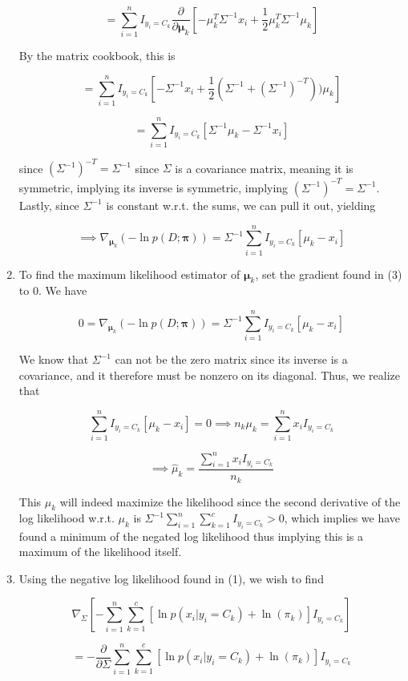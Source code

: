 \documentclass[submit]{harvardml}
\begin{document}
\begin{enumerate}
    $$ = \sum_{i=1}^n  I_{y_i=C_k} \frac{\partial}{\partial \mathbf{\mu}_k}[ -\mu_k^T\Sigma^{-1}x_i  + \frac{1}{2}\mu_k^T\Sigma^{-1}\mu_k]  $$
    
    By the matrix cookbook, this is
    
    $$ = \sum_{i=1}^n  I_{y_i=C_k} [-\Sigma^{-1}x_i + \frac{1}{2}(\Sigma^{-1} + (\Sigma^{-1})^{-T}))\mu_k]  $$
    
    $$ = \sum_{i=1}^n I_{y_i=C_k}[ \Sigma^{-1} \mu_k -\Sigma^{-1}x_i ]$$
    
    since $(\Sigma^{-1})^{-T} = \Sigma^{-1}$ since $\Sigma$ is a covariance matrix, meaning it is symmetric, implying its inverse is symmetric, implying $(\Sigma^{-1})^{-T} = \Sigma^{-1}$. Lastly, since $\Sigma^{-1}$ is constant w.r.t. the sums, we can pull it out, yielding
    
    $$ \implies \boxed{\nabla_{\mathbf{\mu}_k} (-\ln p(D;\mathbf{\pi})) = \Sigma^{-1} \sum_{i=1}^n  I_{y_i=C_k}[  \mu_k -x_i ] }$$
    
    \item To find the maximum likelihood estimator of $\mathbf{\mu}_k$, set the gradient found in (3) to $0$. We have 
    
    
    $$0 =\nabla_{\mathbf{\mu}_k} (-\ln p(D;\mathbf{\pi})) = \Sigma^{-1} \sum_{i=1}^n  I_{y_i=C_k}[  \mu_k -x_i ]  $$
    
    We know that $\Sigma^{-1}$ can not be the zero matrix since its inverse is a covariance, and it therefore must be nonzero on its diagonal. Thus, we realize that
    
    $$ \sum_{i=1}^n  I_{y_i=C_k}[  \mu_k -x_i ] = 0 \implies n_k \mu_k = \sum_{i = 1}^{n} x_iI_{y_i=C_k} $$
    
    $$\implies \boxed{\hat{\mu}_k  = \frac{\sum_{i = 1}^{n} x_iI_{y_i=C_k}}{n_k} }$$
    
    This $\mu_k$ will indeed maximize the likelihood since the second derivative of the log likelihood w.r.t. $\mu_k$ is $\Sigma^{-1} \sum_{i=1}^n \sum_{k=1}^c I_{y_i=C_k} > 0$, which implies we have found a minimum of the negated log likelihood thus implying this is a maximum of the likelihood itself.
    
    \item Using the negative log likelihood found in (1), we wish to find
    
    $$ \nabla_{\Sigma} [ -\sum_{i=1}^n \sum_{k=1}^c [ \ln p(x_i |y_i = C_k) +\ln(\pi_k)] I_{y_i=C_k} ]$$
    
    $$ = - \frac{\partial}{\partial \Sigma}\sum_{i=1}^n \sum_{k=1}^c [ \ln p(x_i |y_i = C_k) +\ln(\pi_k)] I_{y_i=C_k} $$
    

\end{enumerate}
\end{document}
